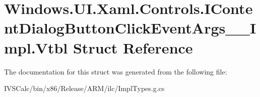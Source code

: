 \hypertarget{struct_windows_1_1_u_i_1_1_xaml_1_1_controls_1_1_i_content_dialog_button_click_event_args_____impl_1_1_vtbl}{}\section{Windows.\+U\+I.\+Xaml.\+Controls.\+I\+Content\+Dialog\+Button\+Click\+Event\+Args\+\_\+\+\_\+\+Impl.\+Vtbl Struct Reference}
\label{struct_windows_1_1_u_i_1_1_xaml_1_1_controls_1_1_i_content_dialog_button_click_event_args_____impl_1_1_vtbl}


The documentation for this struct was generated from the following file\+:\begin{DoxyCompactItemize}
\item 
I\+V\+S\+Calc/bin/x86/\+Release/\+A\+R\+M/ilc/Impl\+Types.\+g.\+cs\end{DoxyCompactItemize}
